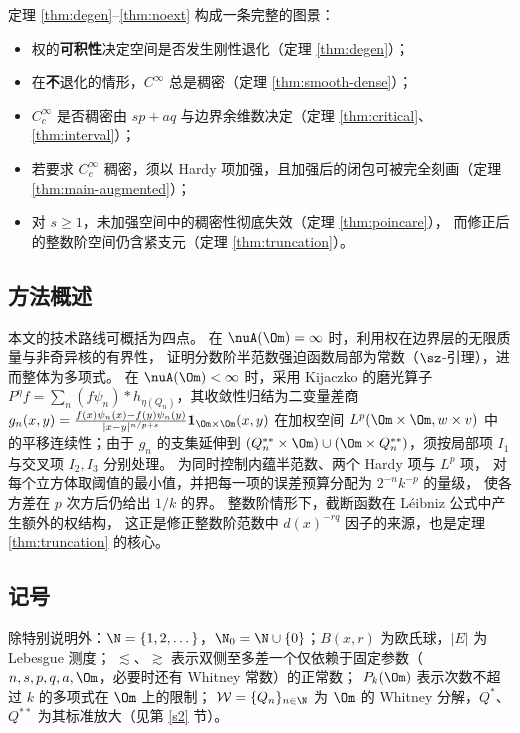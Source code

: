 定理 \ref{thm:degen}--\ref{thm:noext} 构成一条完整的图景：
\begin{itemize}
  \item 权的\textbf{可积性}决定空间是否发生刚性退化（定理 \ref{thm:degen}）；
  \item 在\textbf{不}退化的情形，$C^\infty$ 总是稠密（定理 \ref{thm:smooth-dense}）；
  \item $C_c^\infty$ 是否稠密由 $sp+aq$ 与边界余维数决定（定理 \ref{thm:critical}、\ref{thm:interval}）；
  \item 若要求 $C_c^\infty$ 稠密，须以 Hardy 项加强，且加强后的闭包可被完全刻画（定理 \ref{thm:main-augmented}）；
  \item 对 $s\ge1$，未加强空间中的稠密性彻底失效（定理 \ref{thm:poincare}），
        而修正后的整数阶空间仍含紧支元（定理 \ref{thm:truncation}）。
\end{itemize}

\subsection{方法概述}\label{ss1.4}

本文的技术路线可概括为四点。
 在 $\nuA(\Om)=\infty$ 时，利用权在边界层的无限质量与非奇异核的有界性，
证明分数阶半范数强迫函数局部为常数（$\sz$-引理），进而整体为多项式。
 在 $\nuA(\Om)<\infty$ 时，采用 Kijaczko \cite{k2023} 的磨光算子
$P^\eta f=\sum_n(f\psi_n)*h_{\eta(Q_n)}$，其收敛性归结为二变量差商
$g_n(x,y)=\frac{f(x)\psi_n(x)-f(y)\psi_n(y)}{|x-y|^{n/p+s}}\mathbf 1_{\Om\times\Om}(x,y)$
在加权空间 $L^p(\Om\times\Om,w\times v)$ 中的平移连续性；由于 $g_n$ 的支集延伸到
$(Q_n^{**}\times\Om)\cup(\Om\times Q_n^{**})$，须按局部项 $I_1$ 与交叉项 $I_2,I_3$ 分别处理。
 为同时控制内蕴半范数、两个 Hardy 项与 $L^p$ 项，
对每个立方体取阈值的最小值，并把每一项的误差预算分配为 $2^{-n}k^{-p}$ 的量级，
使各方差在 $p$ 次方后仍给出 $1/k$ 的界。
 整数阶情形下，截断函数在 Léibniz 公式中产生额外的权结构，
这正是修正整数阶范数中 $d(x)^{-rq}$ 因子的来源，也是定理 \ref{thm:truncation} 的核心。

\subsection{记号}\label{ss1.5}

除特别说明外：$\N=\{1,2,\dots\}$，$\N_0=\N\cup\{0\}$；$B(x,r)$ 为欧氏球，$|E|$ 为 Lebesgue 测度；
$\lesssim$、$\gtrsim$ 表示双侧至多差一个仅依赖于固定参数（$n,s,p,q,a,\Om$，必要时还有 Whitney 常数）的正常数；
$P_k(\Om)$ 表示次数不超过 $k$ 的多项式在 $\Om$ 上的限制；
$\mathcal W=\{Q_n\}_{n\in\N}$ 为 $\Om$ 的 Whitney 分解，$Q^*$、$Q^{**}$ 为其标准放大（见第 \ref{s2} 节）。


